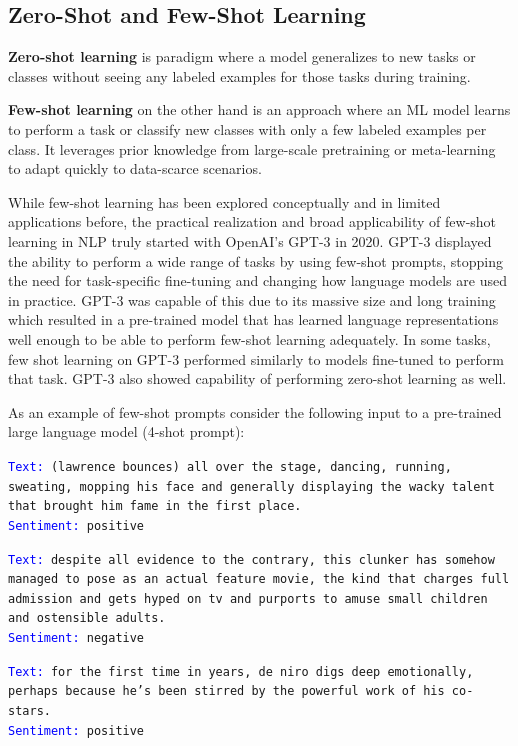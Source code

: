 \documentclass[11pt,twoside]{article}
\begin{document}
\subsection{Zero-Shot and Few-Shot Learning}
\textbf{Zero-shot learning} is paradigm where a model generalizes to new tasks or classes without seeing any labeled examples for those tasks during training.

\textbf{Few-shot learning} on the other hand is an approach where an ML model learns to perform a task or classify new classes with only a few labeled examples per class. It leverages prior knowledge from large-scale pretraining or meta-learning to adapt quickly to data-scarce scenarios.

While few-shot learning has been explored conceptually and in limited applications before, the practical realization and broad applicability of few-shot learning in NLP truly started with OpenAI's GPT-3 in 2020. GPT-3 displayed the ability to perform a wide range of tasks by using few-shot prompts, stopping the need for task-specific fine-tuning and changing how language models are used in practice. GPT-3 was capable of this due to its massive size and long training which resulted in a pre-trained model that has learned language representations well enough to be able to perform few-shot learning adequately. In some tasks, few shot learning on GPT-3 performed similarly to models fine-tuned to perform that task. GPT-3 also showed capability of performing zero-shot learning as well.

As an example of few-shot prompts consider the following input to a pre-trained large language model (4-shot prompt):

\hrulefill

\texttt{\textcolor{blue}{Text:} (lawrence bounces) all over the stage, dancing, running, sweating, mopping his face and generally displaying the wacky talent that brought him fame in the first place.
\\
\textcolor{blue}{Sentiment:} positive}

\texttt{\textcolor{blue}{Text:} despite all evidence to the contrary, this clunker has somehow managed to pose as an actual feature movie, the kind that charges full admission and gets hyped on tv and purports to amuse small children and ostensible adults.\\
\textcolor{blue}{Sentiment:} negative
}

\texttt{\textcolor{blue}{Text:} for the first time in years, de niro digs deep emotionally, perhaps because he's been stirred by the powerful work of his co-stars.\\
\textcolor{blue}{Sentiment:} positive}
\end{document}
